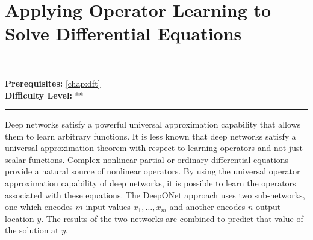 \documentclass[book.tex]{subfiles}
\begin{document}
\chapter{Applying Operator Learning to Solve Differential Equations}

\label{chap:deep_onet}
\noindent\rule{11cm}{0.4pt} \\
\textbf{Prerequisites:} \autoref{chap:dft} \\
\textbf{Difficulty Level:} ** \\
\noindent\rule{11cm}{0.4pt}
\vspace{5mm}

Deep networks satisfy a powerful universal approximation capability that allows them to learn arbitrary functions. It is less known that deep networks satisfy a universal approximation theorem with respect to learning operators and not just scalar functions. Complex nonlinear partial or ordinary differential equations provide a natural source of nonlinear operators. By using the universal operator approximation capability of deep networks, it is possible to learn the operators associated with these equations. The DeepONet \cite{lu2019deeponet} approach uses two sub-networks, one which encodes $m$ input values $x_1,\dotsc, x_m$ and another encodes $n$ output location $y$. The results of the two networks are combined to predict that value of the solution at $y$.

\end{document}
